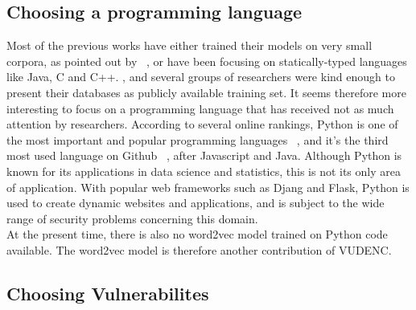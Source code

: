 \documentclass[
	a4paper,
	pagesize,
	pdftex,
	12pt,
	twoside, %
	BCOR=5mm, %
	ngerman,
	fleqn,
	final,
	]{scrartcl}
\begin{document}
\subsection{Choosing a programming language}
Most of the previous works have either trained their models on very small corpora, as pointed out by ~\cite{Bhoopchand.2016}, or have been focusing on statically-typed languages like Java, C and C++. \cite{Bellon.2007,Russell.2018,Liu.2018,Dam.2017, Rolim.2018}, and several groups of researchers were kind enough to present their databases as publicly available training set. It seems therefore more interesting to focus on a programming language that has received not as much attention by researchers. According to several online rankings, Python is one of the most important and popular programming languages ~\cite{AyeshaCuthbert.15.4.2019, VidushiDwivedi.}, and it's the third most used language on Github ~\cite{Github.com.19}, after Javascript and Java. Although Python is known for its applications in data science and statistics, this is not its only area of application. With popular web frameworks such as Djang and Flask, Python is used to create dynamic websites and applications, and is subject to the wide range of security problems concerning this domain.\\
At the present time, there is also no word2vec model trained on Python code available. The word2vec model is therefore  another contribution of VUDENC.\\

\subsection{Choosing Vulnerabilites}
\end{document}
